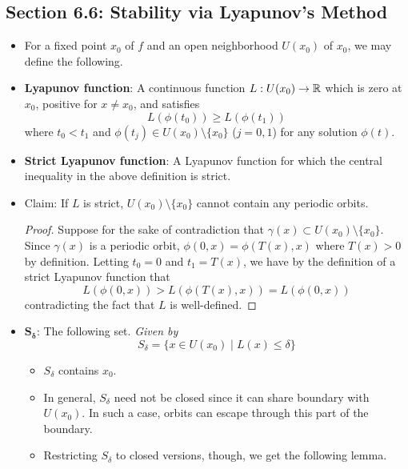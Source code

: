 \documentclass[../notes.tex]{subfiles}
\begin{document}
\subsection*{Section 6.6: Stability via Lyapunov's Method}
\begin{itemize}
    \item For a fixed point $x_0$ of $f$ and an open neighborhood $U(x_0)$ of $x_0$, we may define the following.
    \item \textbf{Lyapunov function}: A continuous function $L:U(x_0)\to\mathbb{R}$ which is zero at $x_0$, positive for $x\neq x_0$, and satisfies
    \begin{equation*}
        L(\phi(t_0)) \geq L(\phi(t_1))
    \end{equation*}
    where $t_0<t_1$ and $\phi(t_j)\in U(x_0)\setminus\{x_0\}$ ($j=0,1$) for any solution $\phi(t)$.
    \item \textbf{Strict Lyapunov function}: A Lyapunov function for which the central inequality in the above definition is strict.
    \item Claim: If $L$ is strict, $U(x_0)\setminus\{x_0\}$ cannot contain any periodic orbits.
    \begin{proof}
        Suppose for the sake of contradiction that $\gamma(x)\subset U(x_0)\setminus\{x_0\}$. Since $\gamma(x)$ is a periodic orbit, $\phi(0,x)=\phi(T(x),x)$ where $T(x)>0$ by definition. Letting $t_0=0$ and $t_1=T(x)$, we have by the definition of a strict Lyapunov function that
        \begin{equation*}
            L(\phi(0,x)) > L(\phi(T(x),x))
            = L(\phi(0,x))
        \end{equation*}
        contradicting the fact that $L$ is well-defined.
    \end{proof}
    \item $\bm{S_\delta}$: The following set. \emph{Given by}
    \begin{equation*}
        S_\delta = \{x\in U(x_0)\mid L(x)\leq\delta\}
    \end{equation*}
    \begin{itemize}
        \item $S_\delta$ contains $x_0$.
        \item In general, $S_\delta$ need not be closed since it can share boundary with $U(x_0)$. In such a case, orbits can escape through this part of the boundary.
        \item Restricting $S_\delta$ to closed versions, though, we get the following lemma.
    \end{itemize}

\end{itemize}
\end{document}
